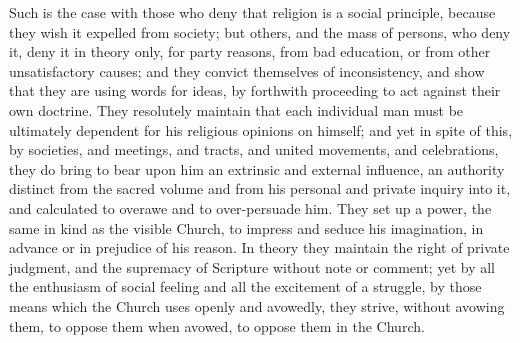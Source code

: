 Such is the
case with those who deny that religion is a social principle, because
they wish it expelled from society; but others, and the mass of persons,
who deny it, deny it in theory only, for party reasons, from bad
education, or from other unsatisfactory causes; and they convict
themselves of inconsistency, and show that they are using words for
ideas, by forthwith proceeding to act against their own doctrine. They
resolutely maintain that each individual man must be ultimately
dependent for his religious opinions on himself; and yet in spite of
this, by societies, and meetings, and tracts, and united movements, and
celebrations, they do bring to bear upon him an extrinsic and external
influence, an authority distinct from the sacred volume and from his
personal and private inquiry into it, and calculated to overawe and to
over-persuade him. They set up a power, the same in kind as the visible
Church, to impress and seduce his imagination, in advance or in
prejudice of his reason. In theory they maintain the right of private
judgment, and the supremacy of Scripture without note or comment; yet by
all the enthusiasm of social feeling and all the excitement of a
struggle, by those means which the Church uses openly and avowedly, they
strive, without avowing them, to oppose them when avowed, to oppose them
in the Church.

